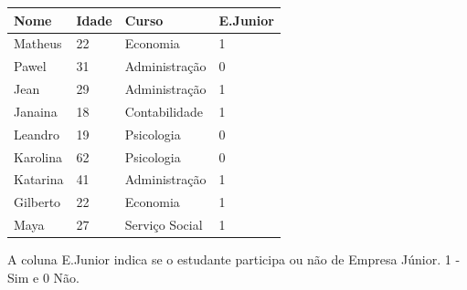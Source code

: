 \documentclass[12pt]{article}
\begin{document}
\begin{table}[H]
\centering
\begin{tabular}{llll}
\hline
Nome     & Idade & Curso          & E.Junior \\ \hline
Matheus  & 22    & Economia       & 1        \\
Pawel    & 31    & Administração  & 0        \\
Jean     & 29    & Administração  & 1        \\
Janaina  & 18    & Contabilidade  & 1        \\
Leandro  & 19    & Psicologia     & 0        \\
Karolina & 62    & Psicologia     & 0        \\
Katarina & 41    & Administração  & 1        \\
Gilberto & 22    & Economia       & 1        \\
Maya     & 27    & Serviço Social & 1        \\ \hline
\end{tabular}
\end{table}

A coluna E.Junior indica se o estudante participa ou não de Empresa Júnior. 1 - Sim e 0 Não.
\end{document}
